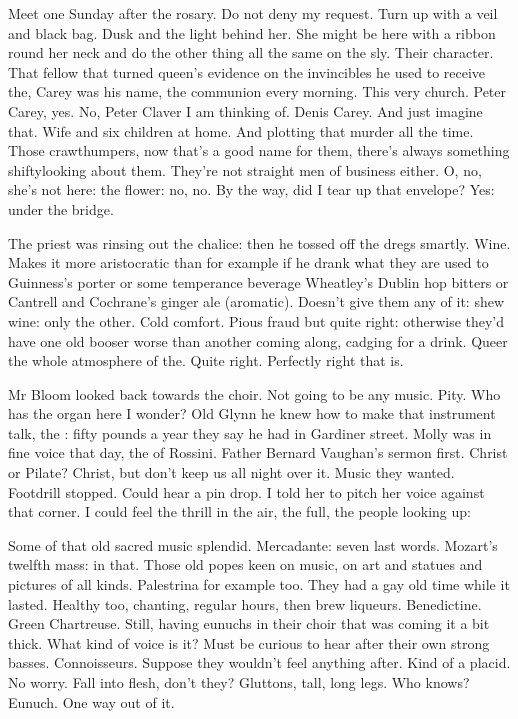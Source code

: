 Meet one Sunday after the rosary.
Do not deny my request.
Turn up with a veil and black bag.
Dusk and the light behind her.
She might be here with a ribbon round her neck
and do the other thing all the same on the sly.
Their character.
That fellow that turned queen's evidence on the invincibles
he used to receive the,
Carey was his name,
the communion every morning.
This very church.
Peter Carey, yes.
No, Peter Claver I am
thinking of.
Denis Carey.
And just imagine that.
Wife and six children at home.
And plotting that murder all the time.
Those crawthumpers,
now that's a good name for them,
there's always something shiftylooking about them.
They're not straight men of business either.
O, no, she's not here:
the flower:
no, no.
By the way, did I tear up that envelope?
Yes: under the bridge.

The priest was rinsing out the chalice:
then he tossed off the dregs smartly.
Wine.
Makes it more aristocratic than
for example if he drank
what they are used to
Guinness's porter or some temperance beverage
Wheatley's Dublin hop bitters
or Cantrell and Cochrane's ginger ale (aromatic).
Doesn't give them any of it:
shew wine:
only the other.
Cold comfort.
Pious fraud but quite right:
otherwise they'd have one old booser worse than another coming along,
cadging for a drink.
Queer the whole atmosphere of the.
Quite right.
Perfectly right that is.

Mr Bloom looked back towards the choir.
Not going to be any music.
Pity.
Who has the organ here I wonder?
Old Glynn he knew how to make that instrument talk,
the :
fifty pounds a year they say he had in Gardiner street.
Molly was in fine voice that day,
the  of Rossini.
Father Bernard Vaughan's sermon first.
Christ or Pilate?
Christ,
but don't keep us all night over it.
Music they wanted.
Footdrill stopped.
Could hear a pin drop.
I told her to pitch her voice against that corner.
I could feel the thrill in the air,
the full,
the people looking up:


Some of that old sacred music splendid.
Mercadante: seven last words.
Mozart's twelfth mass:
 in that.
Those old popes keen on music,
on art and statues and pictures of all kinds.
Palestrina for example too.
They had a gay old time while it lasted.
Healthy too,
chanting,
regular hours,
then brew liqueurs.
Benedictine.
Green Chartreuse.
Still, having eunuchs in their choir
that was coming it a bit thick.
What kind of voice is it?
Must be curious to hear after their own strong basses.
Connoisseurs.
Suppose they wouldn't feel anything after.
Kind of a placid.
No worry.
Fall into flesh, don't they?
Gluttons, tall, long legs.
Who knows?
Eunuch.
One way out of it.

